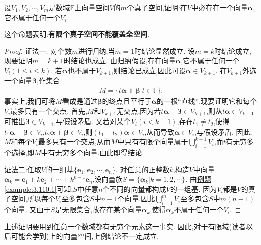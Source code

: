 \documentclass[../../main.tex]{subfiles}
\begin{document}
\begin{proposition}\label{proposition:真子空间外仍有向量存在}
设\(V_1,V_2,\cdots,V_m\)是数域\(\mathbb{F}\)上向量空间\(V\)的\(m\)个真子空间,证明:在\(V\)中必存在一个向量\(\boldsymbol{\alpha}\),它不属于任何一个\(V_i\).
\end{proposition}
\begin{note}
这个命题表明:\textbf{有限个真子空间不能覆盖全空间}.
\end{note}
\begin{proof}
{\color{blue}证法一:}
对个数\(m\)进行归纳,当\(m = 1\)时结论显然成立. 设\(m = k\)时结论成立,现要证明\(m = k + 1\)时结论也成立. 由归纳假设,存在向量\(\boldsymbol{\alpha}\),它不属于任何一个\(V_i(1\leqslant  i\leqslant  k)\). 若\(\boldsymbol{\alpha}\)也不属于\(V_{k + 1}\),则结论已成立,因此可设\(\boldsymbol{\alpha}\in V_{k + 1}\). 在\(V_{k + 1}\)外选一个向量\(\boldsymbol{\beta}\),作集合
\begin{align*}
M = \{t\boldsymbol{\alpha}+\boldsymbol{\beta}|t\in\mathbb{F}\}.
\end{align*}
事实上,我们可将\(M\)看成是通过\(\boldsymbol{\beta}\)的终点且平行于\(\boldsymbol{\alpha}\)的一根“直线”,现要证明它和每个\(V_i\)最多只有一个交点. 首先,\(M\)和\(V_{k + 1}\)无交点,因为若\(t\boldsymbol{\alpha}+\boldsymbol{\beta}\in V_{k + 1}\),则从\(t\boldsymbol{\alpha}\in V_{k + 1}\)可推出\(\boldsymbol{\beta}\in V_{k + 1}\),与假设矛盾. 又若对某个\(V_i(i<k + 1)\),存在\(t_1\neq t_2\),使得\(t_1\boldsymbol{\alpha}+\boldsymbol{\beta}\in V_i\),\(t_2\boldsymbol{\alpha}+\boldsymbol{\beta}\in V_i\),则\((t_1 - t_2)\boldsymbol{\alpha}\in V_i\),从而导致\(\boldsymbol{\alpha}\in V_i\),与假设矛盾. 因此,\(M\)和每个\(V_i\)最多只有一个交点,从而\(M\)中只有有限个向量属于\(\bigcup_{i=1}^{k+1}{V_i}\),而\(t\)有无穷多个选择,即$M$中有无穷多个向量.由此即得结论. 

{\color{blue}证法二:}任取\(V\)的一组基\(\{\boldsymbol{e}_1,\boldsymbol{e}_2,\cdots,\boldsymbol{e}_n\}\). 对任意的正整数\(k\),构造\(V\)中向量\(\boldsymbol{\alpha}_k=\boldsymbol{e}_1 + k\boldsymbol{e}_2+\cdots + k^{n - 1}\boldsymbol{e}_n\),设向量族\(S = \{\boldsymbol{\alpha}_k|k = 1,2,\cdots\}\). 由\hyperref[example:3.110.1]{例题\ref{example:3.110.1}}可知,\(S\)中任意\(n\)个不同的向量都构成\(V\)的一组基. 因为\(V_i\)都是\(V\)的真子空间,所以每个\(V_i\)至多包含\(S\)中\(n - 1\)个向量.因此$\bigcup_{i=1}^m{V_i}$至多包含$S$中$m(n-1)$个向量.
又由于\(S\)是无限集合,故存在某个向量\(\boldsymbol{\alpha}_k\),使得\(\boldsymbol{\alpha}_k\)不属于任何一个\(V_i\).
\end{proof}
\begin{remark}
上述证明要用到任意一个数域都有无穷个元素这一事实. 因此,对于有限域(读者以后可能会学到)上的向量空间,上例结论不一定成立.
\end{remark}
\end{document}
